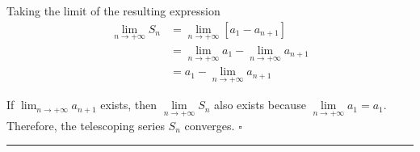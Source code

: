 \documentclass{article}
\begin{document}
{Taking the limit of the resulting expression}
\begin{align*}
    \lim_{n \to +\infty} S_n &= \lim_{n \to +\infty} [a_1 - a_{n+1}] \\
    &= \lim_{n \to +\infty} a_1 - \lim_{n \to +\infty} a_{n+1} \\
    &= a_1 - \lim_{n \to +\infty} a_{n+1}
\end{align*}

{If $\lim_{n \to +\infty} a_{n+1}$ exists, then $\lim\limits_{n \to +\infty} S_n$ also exists because $\lim\limits_{n \to +\infty} a_1=a_1$. Therefore, the telescoping series $S_n$ converges. \hfill $\square$}

\vspace{0.8cm} %
\hrule %
\vspace{0.2cm} %
\end{document}
